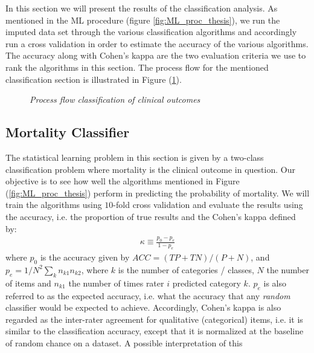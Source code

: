 \documentclass[../thesis.tex]{subfiles}
\begin{document}
\noindent In this section we will present the results of the classification analysis. As mentioned in the ML procedure (figure \ref{fig:ML_proc_thesis}), we run the imputed data set through the various classification algorithms and accordingly run a cross validation in order to estimate the accuracy of the various algorithms. The accuracy along with Cohen’s kappa are the two evaluation criteria we use to rank the algorithms in this section. The process flow for the mentioned classification section is illustrated in Figure (\ref{fig:process_flow_classification}). 

\begin{figure}[!t]
    \centering
    
    \caption[Process flow classification of clinical outcomes]{\textit{Process flow classification of clinical outcomes}}
    \label{fig:process_flow_classification}
\end{figure}

\subsection{Mortality Classifier}

\noindent The statistical learning problem in this section is given by a two-class classification problem where mortality is the clinical outcome in question. Our objective is to see how well the algorithms mentioned in Figure (\ref{fig:ML_proc_thesis}) perform in predicting the probability of mortality. We will train the algorithms using $10$-fold cross validation and evaluate the results using the accuracy, i.e. the proportion of true results and the Cohen's kappa defined by:
\newpage
\begin{align}
    \kappa \equiv \frac{p_0 - p_e}{1 - p_e}
\end{align}
where $p_0$ is the accuracy given by ${\mathit  {ACC}}=({\mathit  {TP}}+{\mathit  {TN}})/(P+N)$, and $p_e = 1 / N^2 \sum_{k} n_{k1}n_{k2}$, where $k$ is the number of categories / classes, $N$ the number of items and $n_{k1}$ the number of times rater $i$ predicted category $k$. $p_e$ is also referred to as the expected accuracy, i.e. what the accuracy that any \textit{random} classifier would be expected to achieve. Accordingly, Cohen's kappa is also regarded as the inter-rater agreement for qualitative (categorical) items, i.e. it is similar to the classification accuracy, except that it is normalized at the baseline of random chance on a dataset. A possible interpretation of this    
\end{document}
